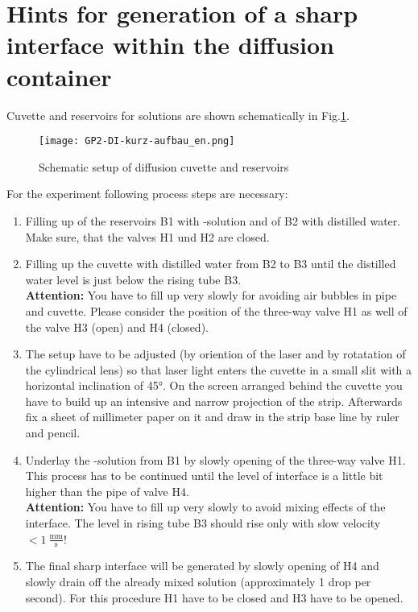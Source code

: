 \documentclass[platz]{tudphygp_eng}
\begin{document}
\section*{Hints for generation of a sharp interface within the diffusion container}

Cuvette and reservoirs for solutions are shown schematically  in Fig.\ref{abb_aufbau}.

\begin{figure}[ht] 
 \centering 
 \label{abb_aufbau}
  \texttt{[image: GP2-DI-kurz-aufbau\_en.png]}
 \centering 
 \caption{Schematic setup of diffusion cuvette and reservoirs}
\end{figure}

For the experiment following process steps are necessary:

\begin{enumerate}
 \item Filling up of the reservoirs B1 with -solution and of B2 with distilled water. Make sure, that the valves H1 und H2 are closed. 
 \item Filling up the cuvette with distilled water from B2 to B3 until the distilled water level is just below the rising tube B3.\\
 \textbf{Attention:} You have to fill up very slowly for avoiding air bubbles in pipe and cuvette. Please consider the position of the three-way valve H1 as well of the valve H3 (open) and H4 (closed).
\item The setup have to be adjusted (by oriention of the laser and by rotatation of the cylindrical lens) so that laser light enters the cuvette in a small slit with a horizontal inclination of 45$°$. On the screen arranged behind the cuvette you have to build up an intensive and narrow projection of the strip. Afterwards fix a sheet of millimeter paper on it and draw in the strip base line by ruler and pencil. 
 \item Underlay the -solution from B1 by slowly opening of the three-way valve H1. This process has to be continued until the level  of interface is a little bit higher than the pipe of valve H4.\\
 \textbf{Attention:} You have to fill up very slowly to avoid mixing effects of the interface. The level in rising tube B3 should rise only with slow velocity $< 1 ~ \frac{\mathrm{mm}}{\mathrm{s}}$!
\item The final sharp interface will be generated by slowly opening of H4 and slowly drain off the already mixed solution (approximately 1 drop per second). For this procedure H1 have to be closed and H3 have to be opened. 

\end{enumerate}
\end{document}
